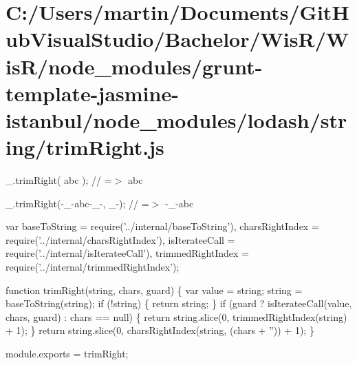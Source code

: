 \hypertarget{_c_1_2_users_2martin_2_documents_2_git_hub_visual_studio_2_bachelor_2_wis_r_2_wis_r_2node_module3e2dcb4badedee82aaa23608c556fded}{}\section{C\+:/\+Users/martin/\+Documents/\+Git\+Hub\+Visual\+Studio/\+Bachelor/\+Wis\+R/\+Wis\+R/node\+\_\+modules/grunt-\/template-\/jasmine-\/istanbul/node\+\_\+modules/lodash/string/trim\+Right.\+js}
\+\_\+.\+trim\+Right(\textquotesingle{} abc \textquotesingle{}); // =$>$ \textquotesingle{} abc\textquotesingle{}

\+\_\+.\+trim\+Right(\textquotesingle{}-\/\+\_\+-\/abc-\/\+\_\+-\/\textquotesingle{}, \textquotesingle{}\+\_\+-\/\textquotesingle{}); // =$>$ \textquotesingle{}-\/\+\_\+-\/abc\textquotesingle{}


\begin{DoxyCodeInclude}
var baseToString = require(\textcolor{stringliteral}{'../internal/baseToString'}),
    charsRightIndex = require(\textcolor{stringliteral}{'../internal/charsRightIndex'}),
    isIterateeCall = require(\textcolor{stringliteral}{'../internal/isIterateeCall'}),
    trimmedRightIndex = require(\textcolor{stringliteral}{'../internal/trimmedRightIndex'});

\textcolor{keyword}{function} trimRight(\textcolor{keywordtype}{string}, chars, guard) \{
  var value = string;
  \textcolor{keywordtype}{string} = baseToString(\textcolor{keywordtype}{string});
  \textcolor{keywordflow}{if} (!\textcolor{keywordtype}{string}) \{
    \textcolor{keywordflow}{return} string;
  \}
  \textcolor{keywordflow}{if} (guard ? isIterateeCall(value, chars, guard) : chars == null) \{
    \textcolor{keywordflow}{return} \textcolor{keywordtype}{string}.slice(0, trimmedRightIndex(\textcolor{keywordtype}{string}) + 1);
  \}
  \textcolor{keywordflow}{return} \textcolor{keywordtype}{string}.slice(0, charsRightIndex(\textcolor{keywordtype}{string}, (chars + \textcolor{stringliteral}{''})) + 1);
\}

module.exports = trimRight;
\end{DoxyCodeInclude}
 